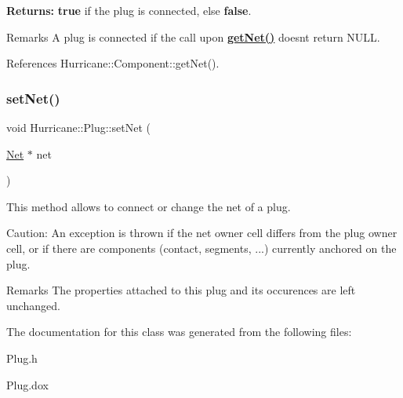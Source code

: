 {\bfseries Returns\+:} {\bfseries true} if the plug is connected, else {\bfseries false}.

\begin{DoxyRemark}{Remarks}
A plug is connected if the call upon {\bfseries \mbox{\hyperlink{classHurricane_1_1Component_a1556ef77d6b89bfc17698d52ebde9791}{get\+Net()}}} doesn\textquotesingle{}t return N\+U\+LL. 
\end{DoxyRemark}


References Hurricane\+::\+Component\+::get\+Net().

\mbox{\label{classHurricane_1_1Plug_af5a0448a5cb0c4956f2f1b28f9c87530}} 
\subsubsection{\texorpdfstring{set\+Net()}{setNet()}}
{\footnotesize\ttfamily void Hurricane\+::\+Plug\+::set\+Net (\begin{DoxyParamCaption}\item[{\mbox{\hyperlink{classHurricane_1_1Net}{Net}} $\ast$}]{net }\end{DoxyParamCaption})}

This method allows to connect or change the net of a plug.

\begin{DoxyParagraph}{Caution\+: An exception is thrown if the net owner cell differs from the }
plug owner cell, or if there are components (contact, segments, ...) currently anchored on the plug.
\end{DoxyParagraph}
\begin{DoxyRemark}{Remarks}
The properties attached to this plug and its occurences are left unchanged. 
\end{DoxyRemark}


The documentation for this class was generated from the following files\+:\begin{DoxyCompactItemize}
\item 
Plug.\+h\item 
Plug.\+dox\end{DoxyCompactItemize}
